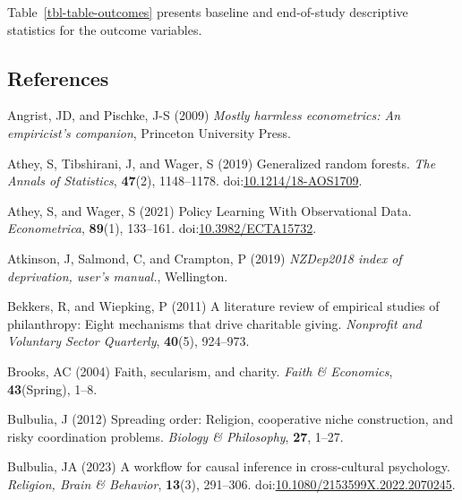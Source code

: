\documentclass[
  single column]{article}
\newlength{\cslhangindent}
\newenvironment{CSLReferences}[2] %
 {\begin{list}{}{%
  \setlength{\itemindent}{0pt}
  \setlength{\leftmargin}{0pt}
  \setlength{\parsep}{0pt}
  \ifodd #1
   \setlength{\leftmargin}{\cslhangindent}
   \setlength{\itemindent}{-1\cslhangindent}
  \fi
  \setlength{\itemsep}{#2\baselineskip}}}
 {\end{list}}
\begin{document}
Table~\ref{tbl-table-outcomes} presents baseline and end-of-study
descriptive statistics for the outcome variables.

\newpage{}

\subsection*{References}\label{references}

\label{refs}
\begin{CSLReferences}{1}{0}
Angrist, JD, and Pischke, J-S (2009) \emph{Mostly harmless econometrics:
An empiricist's companion}, Princeton University Press.

Athey, S, Tibshirani, J, and Wager, S (2019) Generalized random forests.
\emph{The Annals of Statistics}, \textbf{47}(2), 1148--1178.
doi:\href{https://doi.org/10.1214/18-AOS1709}{10.1214/18-AOS1709}.

Athey, S, and Wager, S (2021) Policy Learning With Observational Data.
\emph{Econometrica}, \textbf{89}(1), 133--161.
doi:\href{https://doi.org/10.3982/ECTA15732}{10.3982/ECTA15732}.

Atkinson, J, Salmond, C, and Crampton, P (2019) \emph{NZDep2018 index of
deprivation, user{'}s manual.}, Wellington.

Bekkers, R, and Wiepking, P (2011) A literature review of empirical
studies of philanthropy: Eight mechanisms that drive charitable giving.
\emph{Nonprofit and Voluntary Sector Quarterly}, \textbf{40}(5),
924--973.

Brooks, AC (2004) Faith, secularism, and charity. \emph{Faith \&
Economics}, \textbf{43}(Spring), 1--8.

Bulbulia, J (2012) Spreading order: Religion, cooperative niche
construction, and risky coordination problems. \emph{Biology \&
Philosophy}, \textbf{27}, 1--27.

Bulbulia, JA (2023) A workflow for causal inference in cross-cultural
psychology. \emph{Religion, Brain \& Behavior}, \textbf{13}(3),
291--306.
doi:\href{https://doi.org/10.1080/2153599X.2022.2070245}{10.1080/2153599X.2022.2070245}.


\end{CSLReferences}
\end{document}
